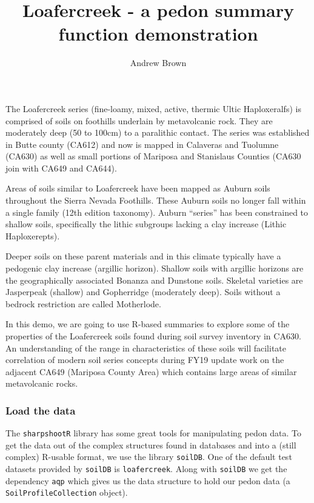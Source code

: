 \documentclass[]{article}
\title{Loafercreek - a pedon summary function demonstration}
\author{Andrew Brown}
\date{}
\begin{document}
\maketitle

The Loafercreek series (fine-loamy, mixed, active, thermic Ultic
Haploxeralfs) is comprised of soils on foothills underlain by
metavolcanic rock. They are moderately deep (50 to 100cm) to a
paralithic contact. The series was established in Butte county (CA612)
and now is mapped in Calaveras and Tuolumne (CA630) as well as small
portions of Mariposa and Stanislaus Counties (CA630 join with CA649 and
CA644).

Areas of soils similar to Loafercreek have been mapped as Auburn soils
throughout the Sierra Nevada Foothills. These Auburn soils no longer
fall within a single family (12th edition taxonomy). Auburn ``series''
has been constrained to shallow soils, specifically the lithic subgroups
lacking a clay increase (Lithic Haploxerepts).

Deeper soils on these parent materials and in this climate typically
have a pedogenic clay increase (argillic horizon). Shallow soils with
argillic horizons are the geographically associated Bonanza and Dunstone
soils. Skeletal varieties are Jasperpeak (shallow) and Gopherridge
(moderately deep). Soils without a bedrock restriction are called
Motherlode.

In this demo, we are going to use R-based summaries to explore some of
the properties of the Loafercreek soils found during soil survey
inventory in CA630. An understanding of the range in characteristics of
these soils will facilitate correlation of modern soil series concepts
during FY19 update work on the adjacent CA649 (Mariposa County Area)
which contains large areas of similar metavolcanic rocks.

\subsubsection{Load the data}\label{load-the-data}

The \texttt{sharpshootR} library has some great tools for manipulating
pedon data. To get the data out of the complex structures found in
databases and into a (still complex) R-usable format, we use the library
\texttt{soilDB}. One of the default test datasets provided by
\texttt{soilDB} is \texttt{loafercreek}. Along with \texttt{soilDB} we
get the dependency \texttt{aqp} which gives us the data structure to
hold our pedon data (a \texttt{SoilProfileCollection} object).
\end{document}
